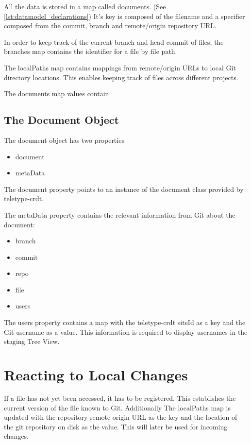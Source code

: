 All the data is stored in a map called documents. (See \autoref{lst:datamodel_declarations})
It's key is composed of the filename and a specifier composed from the commit, branch and remote/origin repository URL.

In order to keep track of the current branch and head commit of files, the branches map contains the identifier for a file by file path.

The localPaths map contains mappings from remote/origin URLs to local Git directory locations.
This enables keeping track of files across different projects.


The documents map values contain

\subsection{The Document Object}

The document object has two properties

\begin{itemize}
    \item document
    \item metaData
\end{itemize}

The document property points to an instance of the document class provided by teletype-crdt.

The metaData property contains the relevant information from Git about the document:
\begin{itemize}
    \item branch
    \item commit
    \item repo
    \item file
    \item users
\end{itemize}

The users property contains a map with the teletype-crdt siteId as a key and the Git username as a value.
This information is required to display usernames in the staging Tree View.

\section{Reacting to Local Changes}
If a file has not yet been accessed, it has to be registered. This establishes the current version of the file known to Git. Additionally The localPaths map is updated with the repository remote origin URL as the key and the location of the git repository on disk as the value. This will later be used for incoming changes.

